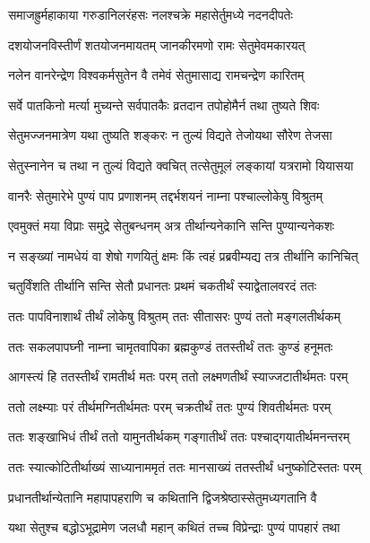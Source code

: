 \twolineshloka
{समाजह्रुर्महाकाया गरुडानिलरंहसः}
{नलश्चक्रे महासेर्तुमध्ये नदनदीपतेः}%

\twolineshloka
{दशयोजनविस्तीर्णं शतयोजनमायतम्}
{जानकीरमणो रामः सेतुमेवमकारयत्}%

\twolineshloka
{नलेन वानरेन्द्रेण विश्वकर्मसुतेन वै}
{तमेवं सेतुमासाद्य रामचन्द्रेण कारितम्}%

\twolineshloka
{सर्वे पातकिनो मर्त्या मुच्यन्ते सर्वपातकैः}
{व्रतदान तपोहोमैर्न तथा तुष्यते शिवः}%

\twolineshloka
{सेतुमज्जनमात्रेण यथा तुष्यति शङ्करः}
{न तुल्यं विद्यते तेजोयथा सौरेण तेजसा}%

\twolineshloka
{सेतुस्नानेन च तथा न तुल्यं विद्यते क्वचित्}
{तत्सेतुमूलं लङ्कायां यत्ररामो यियासया}%

\twolineshloka
{वानरैः सेतुमारेभे पुण्यं पाप प्रणाशनम्}
{तद्दर्भशयनं नाम्ना पश्चाल्लोकेषु विश्रुतम्}%

\twolineshloka
{एवमुक्तं मया विप्राः समुद्रे सेतुबन्धनम्}
{अत्र तीर्थान्यनेकानि सन्ति पुण्यान्यनेकशः}%

\twolineshloka
{न सङ्ख्यां नामधेयं वा शेषो गणयितुं क्षमः}
{किं त्वहं प्रब्रवीम्यद्य तत्र तीर्थानि कानिचित्}%

\twolineshloka
{चतुर्विंशति तीर्थानि सन्ति सेतौ प्रधानतः}
{प्रथमं चकतीर्थं स्याद्वेतालवरदं ततः}%

\twolineshloka
{ततः पापविनाशार्थं तीर्थं लोकेषु विश्रुतम्}
{ततः सीतासरः पुण्यं ततो मङ्गलतीर्थकम्}%

\twolineshloka
{ततः सकलपापघ्नी नाम्ना चामृतवापिका}
{ब्रह्मकुण्डं ततस्तीर्थं ततः कुण्डं हनूमतः}%

\twolineshloka
{आगस्त्यं हि ततस्तीर्थं रामतीर्थ मतः परम्}
{ततो लक्ष्मणतीर्थं स्याज्जटातीर्थमतः परम्}%

\twolineshloka
{ततो लक्ष्म्याः परं तीर्थमग्नितीर्थमतः परम्}
{चक्रतीर्थं ततः पुण्यं शिवतीर्थमतः परम्}%

\twolineshloka
{ततः शङ्खाभिधं तीर्थं ततो यामुनतीर्थकम्}
{गङ्गातीर्थं ततः पश्चाद्गयातीर्थमनन्तरम्}%

\twolineshloka
{ततः स्यात्कोटितीर्थाख्यं साध्यानाममृतं ततः}
{मानसाख्यं ततस्तीर्थं धनुष्कोटिस्ततः परम्}%

\twolineshloka
{प्रधानतीर्थान्येतानि महापापहराणि च}
{कथितानि द्विजश्रेष्ठास्सेतुमध्यगतानि वै}%

\twolineshloka
{यथा सेतुश्च बद्धोऽभूद्रामेण जलधौ महान्}
{कथितं तच्च विप्रेन्द्राः पुण्यं पापहारं तथा}%

